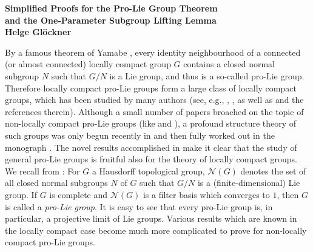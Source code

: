 \documentclass[12pt]{article}
\newcommand{\cN}{{\mathcal N}}
\begin{document}
%
%
\begin{center}
{\Large \bf Simplified Proofs for the
Pro-Lie Group Theorem\\[2mm]
and the One-Parameter Subgroup Lifting
Lemma}\\[6mm]
{\bf Helge Gl\"{o}ckner}\vspace{5mm}
\end{center}
%
\begin{abstract}
This note is devoted to the theory of
projective limits of finite-dimensional
Lie groups, as
developed in the recent monograph
[Hofmann, K.\,H. and S.\,A. Morris,
``The Lie Theory of Connected Pro-Lie Groups,''
EMS Publ.\ House, 2007].
We replace the original, highly non-trivial
proof of the One-Parameter Subgroup
Lifting Lemma given in the monograph
by a shorter and more elementary argument.
Furthermore, we shorten (and correct)
the proof of the so-called
Pro-Lie Group Theorem, which asserts
that pro-Lie groups and
projective limits of Lie groups coincide.\vspace{2mm}
\end{abstract}
%
\noindent
By a famous theorem of Yamabe \cite{Yam},
every identity neighbourhood of a connected (or almost connected)
locally compact group $G$ contains a
closed normal subgroup $N$ such that $G/N$ is a Lie group,
and thus is a so-called pro-Lie group.
Therefore locally compact pro-Lie groups
form a large class of locally compact groups,
which has been studied by many authors
(see, e.g., \cite{Iwa}, \cite{Las},
\cite{MaZ} as well as
\cite{HMS} and the references therein).
Although a small number of papers
broached on the topic of non-locally compact pro-Lie groups
(like \cite{Hof} and \cite{Glo}),
a profound structure theory of such groups was only
begun recently in \cite{HMo}
and then fully worked out in
the monograph \cite{HaM}.
The novel results accomplished in \cite{HaM}
make it clear that the study of general pro-Lie groups
is fruitful also for the theory of locally
compact groups.\\[2.5mm]
%
We recall from \cite{HaM}:
For $G$ a Hausdorff topological group,
$\cN(G)$ denotes the set of all closed
normal subgroups $N$ of $G$ such that $G/N$ is a (finite-dimensional)
Lie group. If $G$ is complete and $\cN(G)$ is a filter basis
which converges to $1$, then $G$ is called
a \emph{pro-Lie group}.
It is easy to see that every pro-Lie group is,
in particular, a projective limit of Lie groups.
Various results which are known in the locally
compact case become much more complicated
to prove for non-locally compact pro-Lie groups.
\end{document}
